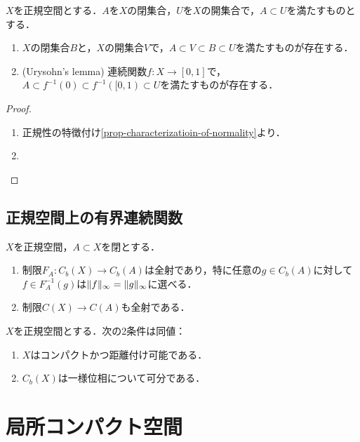 \documentclass[uplatex,dvipdfmx]{jsreport}
\begin{document}
\begin{lemma}\label{lemma-Urysohn's-lemma}
    $X$を正規空間とする．$A$を$X$の閉集合，$U$を$X$の開集合で，$A\subset U$を満たすものとする．
    \begin{enumerate}
        \item $X$の閉集合$B$と，$X$の開集合$V$で，$A\subset V\subset B\subset U$を満たすものが存在する．
        \item (Urysohn's lemma) 連続関数$f:X\to[0,1]$で，$A\subset f^{-1}(0)\subset f^{-1}([0,1)\subset U$を満たすものが存在する．
    \end{enumerate}
\end{lemma}
\begin{proof}\mbox{}
    \begin{enumerate}
        \item 正規性の特徴付け\ref{prop-characterizatioin-of-normality}より．
        \item 
    \end{enumerate}
\end{proof}

\subsection{正規空間上の有界連続関数}

\begin{theorem}[Tietzeの延長定理 (AC)]
    $X$を正規空間，$A\subset X$を閉とする．
    \begin{enumerate}
        \item 制限$F_A:C_b(X)\to C_b(A)$は全射であり，特に任意の$g\in C_b(A)$に対して$f\in F_A^{-1}(g)$は$\|f\|_\infty=\|g\|_\infty$に選べる．
        \item 制限$C(X)\to C(A)$も全射である．
    \end{enumerate}
\end{theorem}

\begin{corollary}[有界連続関数の空間が可分になる条件 (AC)]
    $X$を正規空間とする．次の2条件は同値：
    \begin{enumerate}
        \item $X$はコンパクトかつ距離付け可能である．
        \item $C_b(X)$は一様位相について可分である．
    \end{enumerate}
\end{corollary}

\section{局所コンパクト空間}
\end{document}

